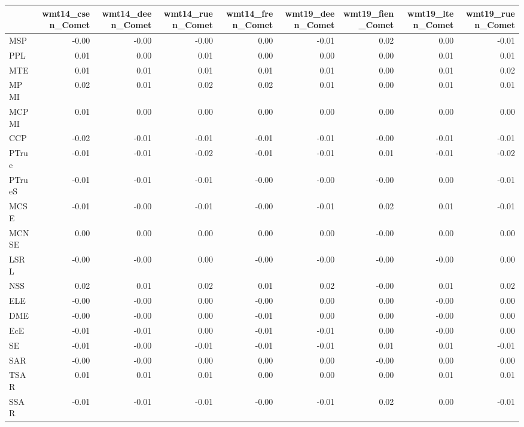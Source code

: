 \begin{tabular}{lrrrrrrrr}
\toprule
 & wmt14\_csen\_Comet & wmt14\_deen\_Comet & wmt14\_ruen\_Comet & wmt14\_fren\_Comet & wmt19\_deen\_Comet & wmt19\_fien\_Comet & wmt19\_lten\_Comet & wmt19\_ruen\_Comet \\
\midrule
MSP & -0.00 & -0.00 & -0.00 & 0.00 & -0.01 & 0.02 & 0.00 & -0.01 \\
PPL & 0.01 & 0.00 & 0.01 & 0.00 & 0.00 & 0.00 & 0.01 & 0.01 \\
MTE & 0.01 & 0.01 & 0.01 & 0.01 & 0.01 & 0.00 & 0.01 & 0.02 \\
MPMI & 0.02 & 0.01 & 0.02 & 0.02 & 0.01 & 0.00 & 0.01 & 0.01 \\
MCPMI & 0.01 & 0.00 & 0.00 & 0.00 & 0.00 & 0.00 & 0.00 & 0.00 \\
CCP & -0.02 & -0.01 & -0.01 & -0.01 & -0.01 & -0.00 & -0.01 & -0.01 \\
PTrue & -0.01 & -0.01 & -0.02 & -0.01 & -0.01 & 0.01 & -0.01 & -0.02 \\
PTrueS & -0.01 & -0.01 & -0.01 & -0.00 & -0.00 & -0.00 & 0.00 & -0.01 \\
MCSE & -0.01 & -0.00 & -0.01 & -0.00 & -0.01 & 0.02 & 0.01 & -0.01 \\
MCNSE & 0.00 & 0.00 & 0.00 & 0.00 & 0.00 & -0.00 & 0.00 & 0.00 \\
LSRL & -0.00 & -0.00 & 0.00 & -0.00 & -0.00 & -0.00 & -0.00 & 0.00 \\
NSS & 0.02 & 0.01 & 0.02 & 0.01 & 0.02 & -0.00 & 0.01 & 0.02 \\
ELE & -0.00 & -0.00 & 0.00 & -0.00 & 0.00 & 0.00 & -0.00 & 0.00 \\
DME & -0.00 & -0.00 & 0.00 & -0.01 & 0.00 & 0.00 & -0.00 & 0.00 \\
EcE & -0.01 & -0.01 & 0.00 & -0.01 & -0.01 & 0.00 & -0.00 & 0.00 \\
SE & -0.01 & -0.00 & -0.01 & -0.01 & -0.01 & 0.01 & 0.01 & -0.01 \\
SAR & -0.00 & -0.00 & 0.00 & 0.00 & 0.00 & -0.00 & 0.00 & 0.00 \\
TSAR & 0.01 & 0.01 & 0.01 & 0.00 & 0.00 & 0.00 & 0.01 & 0.01 \\
SSAR & -0.01 & -0.01 & -0.01 & -0.00 & -0.01 & 0.02 & 0.00 & -0.01 \\
\bottomrule
\end{tabular}
